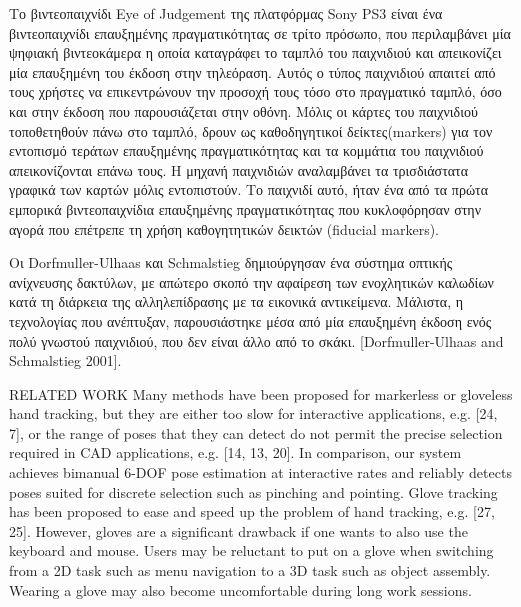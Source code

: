 Το βιντεοπαιχνίδι Eye of Judgement της πλατφόρμας Sony PS3 είναι ένα βιντεοπαιχνίδι επαυξημένης πραγματικότητας σε τρίτο πρόσωπο, που περιλαμβάνει μία ψηφιακή βιντεοκάμερα η οποία καταγράφει το ταμπλό του παιχνιδιού και απεικονίζει μία επαυξημένη του έκδοση στην τηλεόραση. Αυτός ο τύπος παιχνιδιού απαιτεί από τους χρήστες να επικεντρώνουν την προσοχή τους τόσο στο πραγματικό ταμπλό, όσο και στην έκδοση που παρουσιάζεται στην οθόνη. Μόλις οι κάρτες του παιχνιδιού τοποθετηθούν πάνω στο ταμπλό, δρουν ως καθοδηγητικοί δείκτες(markers) για τον εντοπισμό τεράτων επαυξημένης πραγματικότητας και τα κομμάτια του παιχνιδιού απεικονίζονται επάνω τους. Η μηχανή παιχνιδιών αναλαμβάνει τα τρισδιάστατα γραφικά των καρτών μόλις εντοπιστούν. Το παιχνιδί αυτό, ήταν ένα από τα πρώτα εμπορικά βιντεοπαιχνίδια επαυξημένης πραγματικότητας που κυκλοφόρησαν στην αγορά που επέτρεπε τη χρήση καθογητητικών δεικτών (fiducial markers).


Οι Dorfmuller-Ulhaas και Schmalstieg δημιούργησαν ένα σύστημα οπτικής ανίχνευσης δακτύλων, με απώτερο σκοπό την αφαίρεση των ενοχλητικών καλωδίων κατά τη διάρκεια της αλληλεπίδρασης με τα εικονικά αντικείμενα. Μάλιστα, η τεχνολογίας που ανέπτυξαν, παρουσιάστηκε μέσα από μία επαυξημένη έκδοση ενός πολύ γνωστού παιχνιδιού, που δεν είναι άλλο από το σκάκι. [Dorfmuller-Ulhaas and Schmalstieg 2001].



RELATED WORK
Many methods have been proposed for markerless or gloveless
hand tracking, but they are either too slow for interactive
applications, e.g. [24, 7], or the range of poses that they can
detect do not permit the precise selection required in CAD
applications, e.g. [14, 13, 20]. In comparison, our system
achieves bimanual 6-DOF pose estimation at interactive rates
and reliably detects poses suited for discrete selection such as
pinching and pointing.
Glove tracking has been proposed to ease and speed up the
problem of hand tracking, e.g. [27, 25]. However, gloves are
a significant drawback if one wants to also use the keyboard
and mouse. Users may be reluctant to put on a glove when
switching from a 2D task such as menu navigation to a 3D
task such as object assembly. Wearing a glove may also become
uncomfortable during long work sessions.


